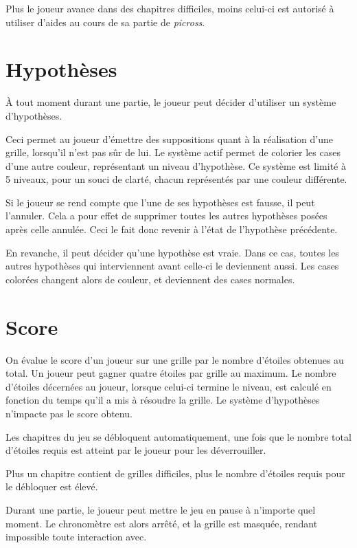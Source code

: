 \documentclass[a4paper, 12pt]{report}
\begin{document}
			Plus le joueur avance dans des chapitres difficiles, moins celui-ci est autorisé à utiliser d'aides au cours de sa partie de \textit{picross}. 

		\section{Hypothèses}	
		
			À tout moment durant une partie, le joueur peut décider d'utiliser un système d'hypothèses. 
			
			Ceci permet au joueur d'émettre des suppositions quant à la réalisation d'une grille, lorsqu'il n'est pas sûr de lui. Le système actif permet de colorier les cases d'une autre couleur, représentant un niveau d'hypothèse. Ce système est limité à 5 niveaux, pour un souci de clarté, chacun représentés par une couleur différente.
			
			Si le joueur se rend compte que l'une de ses hypothèses est fausse, il peut l'annuler. Cela a pour effet de supprimer toutes les autres hypothèses posées après celle annulée. Ceci le fait donc revenir à l'état de l'hypothèse précédente.
			
			En revanche, il peut décider qu'une hypothèse est vraie. Dans ce cas, toutes les autres hypothèses qui interviennent avant celle-ci le deviennent aussi. Les cases colorées changent alors de couleur, et deviennent des cases normales.

		\section{Score}
		
			On évalue le score d'un joueur sur une grille par le nombre d'étoiles obtenues au total. Un joueur peut gagner quatre étoiles par grille au maximum. Le nombre d'étoiles décernées au joueur, lorsque celui-ci termine le niveau, est calculé en fonction du temps qu'il a mis à résoudre la grille. Le système d'hypothèses n'impacte pas le score obtenu. 
			
			Les chapitres du jeu se débloquent automatiquement, une fois que le nombre total d'étoiles requis est atteint par le joueur pour les déverrouiller.
			
			Plus un chapitre contient de grilles difficiles, plus le nombre d'étoiles requis pour le débloquer est élevé.
			
			Durant une partie, le joueur peut mettre le jeu en pause à n'importe quel moment. Le chronomètre est alors arrêté, et la grille est masquée, rendant impossible toute interaction avec.
\end{document}
